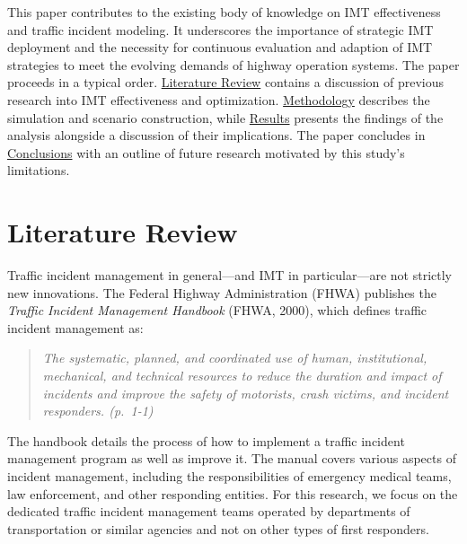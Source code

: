 \documentclass[fancy, oneside, mastersfancy, ms]{byuthesis}
\begin{document}
This paper contributes to the existing body of knowledge on IMT
effectiveness and traffic incident modeling. It underscores the
importance of strategic IMT deployment and the necessity for continuous
evaluation and adaption of IMT strategies to meet the evolving demands
of highway operation systems. The paper proceeds in a typical order.
\protect\hyperlink{sec-literature}{Literature Review} contains a
discussion of previous research into IMT effectiveness and optimization.
\protect\hyperlink{sec-methods}{Methodology} describes the simulation
and scenario construction, while
\protect\hyperlink{sec-results}{Results} presents the findings of the
analysis alongside a discussion of their implications. The paper
concludes in \protect\hyperlink{sec-conclusions}{Conclusions} with an
outline of future research motivated by this study's limitations.


\hypertarget{sec-literature}{%
\chapter{Literature Review}\label{sec-literature}}

Traffic incident management in general---and IMT in particular---are not
strictly new innovations. The Federal Highway Administration (FHWA)
publishes the \emph{Traffic Incident Management Handbook} (FHWA, 2000),
which defines traffic incident management as:

\begin{quote}
\emph{The systematic, planned, and coordinated use of human,
institutional, mechanical, and technical resources to reduce the
duration and impact of incidents and improve the safety of motorists,
crash victims, and incident responders. (p.~1-1)}
\end{quote}

The handbook details the process of how to implement a traffic incident
management program as well as improve it. The manual covers various
aspects of incident management, including the responsibilities of
emergency medical teams, law enforcement, and other responding entities.
For this research, we focus on the dedicated traffic incident management
teams operated by departments of transportation or similar agencies and
not on other types of first responders.
\end{document}
